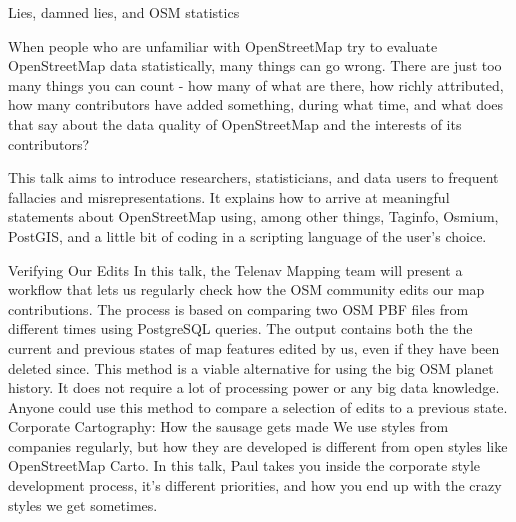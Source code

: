%
{Lies, damned lies, and OSM statistics}%
{}%
{%
  When people who are unfamiliar with OpenStreetMap try to evaluate OpenStreetMap data
  statistically, many things can go wrong. There are just too many things you can count - how many
  of what are there, how richly attributed, how many contributors have added something, during what
  time, and what does that say about the data quality of OpenStreetMap and the interests of its
  contributors?

  This talk aims to introduce researchers, statisticians, and data users to frequent fallacies and
  misrepresentations. It explains how to arrive at meaningful statements about OpenStreetMap using,
  among other things, Taginfo, Osmium, PostGIS, and a little bit of coding in a scripting language of
  the user's choice.
%
}
%
{Verifying Our Edits}%
{}%
{%
  In this talk, the Telenav Mapping team will present a workflow that lets us regularly check how
  the OSM community edits our map contributions. The process is based on comparing two OSM PBF files
  from different times using PostgreSQL queries. The output contains both the the current and
  previous states of map features edited by us, even if they have been deleted since. This method is
  a viable alternative for using the big OSM planet history. It does not require a lot of processing
  power or any big data knowledge. Anyone could use this method to compare a selection of edits to a
  previous state.%
}
%
{Corporate Cartography: How the sausage gets made}%
{}%
{%
  We use styles from companies regularly, but how they are developed is different from open styles
  like OpenStreetMap Carto. In this talk, Paul takes you inside the corporate style development
  process, it's different priorities, and how you end up with the crazy styles we get sometimes.%
}


